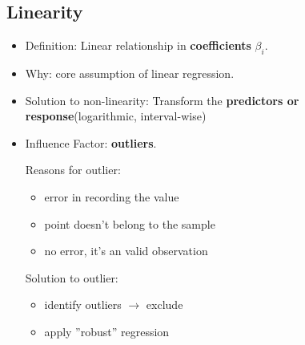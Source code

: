 \subsection{Linearity}
\begin{itemize}
	\item Definition: Linear relationship in \textbf{coefficients} $\beta_i$.
	\item Why: core assumption of linear regression.
	\item Solution to non-linearity: Transform the \textbf{predictors or response}(logarithmic, interval-wise)
	\item Influence Factor: \textbf{outliers}. 
	
	Reasons for outlier: 
	\begin{itemize}
		\item error in recording the value
		\item point doesn't belong to the sample
		\item no error, it's an valid observation
	\end{itemize} 
	Solution to outlier:
	\begin{itemize}
		\item identify outliers $\rightarrow$ exclude 
		\item apply ''robust'' regression
	\end{itemize}
\end{itemize}

